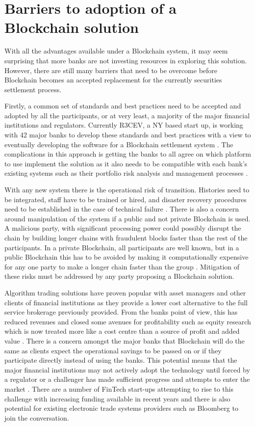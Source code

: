 \documentclass[pdftex]{article}
\begin{document}
\section{Barriers to adoption of a Blockchain solution}

With all the advantages available under a Blockchain system, it may seem surprising that more banks are not investing resources in exploring this solution. However, there are still many barriers that need to be overcome before Blockchain becomes an accepted replacement for the currently securities settlement process.

Firstly, a common set of standards and best practices need to be accepted and adopted by all the participants, or at very least, a majority of the major financial institutions and regulators. Currently R3CEV, a NY based start up, is working with 42 major banks to develop these standards and best practices with a view to eventually developing the software for a Blockchain settlement system \cite{Deloitte}. The complications in this approach is getting the banks to all agree on which platform to use implement the solution as it also needs to be compatible with each bank's existing systems such as their portfolio risk analysis and management processes \cite{WymanEuro}.

With any new system there is the operational risk of transition. Histories need to be integrated, staff have to be trained or hired, and disaster recovery procedures need to be established in the case of technical failure \cite{Accenture}. There is also a concern around manipulation of the system if a public and not private Blockchain is used. A malicious party, with significant processing power could possibly disrupt the chain by building longer chains with fraudulent blocks faster than the rest of the participants. In a private Blockchain, all participants are well known, but in a public Blockchain this has to be avoided by making it computationally expensive for any one party to make a longer chain faster than the group \cite{gentleIntro}. Mitigation of these risks must be addressed by any party proposing a Blockchain solution.

Algorithm trading solutions have proven popular with asset managers and other clients of financial institutions as they provide a lower cost alternative to the full service brokerage previously provided. From the banks point of view, this has reduced revenues and closed some avenues for profitability such as equity research which is now treated more like a cost centre than a source of profit and added value \cite{FT}. There is a concern amongst the major banks that Blockchain will do the same as clients expect the operational savings to be passed on or if they participate directly instead of using the banks. This potential means that the major financial institutions may not actively adopt the technology until forced by a regulator or a challenger has made sufficient progress and attempts to enter the market \cite{WymanEuro}. There are a number of FinTech start-ups attempting to rise to this challenge with increasing funding available in recent years \cite{Accenture} and there is also potential for existing electronic trade systems providers such as Bloomberg to join the conversation.
\end{document}
